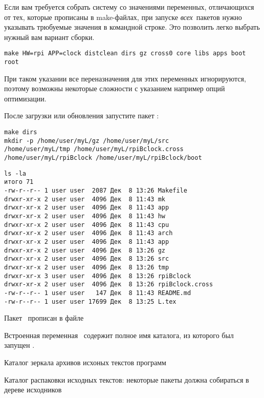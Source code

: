 
Если вам требуется собрать систему со значениями переменных, отличающихся от
тех, которые прописаны в make-файлах, при запуске \emph{всех}\ пакетов нужно
указывать трюбуемые значения в командной строке. Это позволить легко выбрать
нужный вам вариант сборки.

\begin{verbatim}
make HW=rpi APP=clock distclean dirs gz cross0 core libs apps boot root
\end{verbatim}

При таком указании все переназначения для этих переменных игнорируются, поэтому
возможны некоторые сложности с указанием например опций оптимизации.

 \label{azdirs}

После загрузки или обновления запустите пакет :

\begin{verbatim}
make dirs
mkdir -p /home/user/myL/gz /home/user/myL/src
/home/user/myL/tmp /home/user/myL/rpiBclock.cross
/home/user/myL/rpiBclock /home/user/myL/rpiBclock/boot
\end{verbatim}
\begin{verbatim}
ls -la
итого 71
-rw-r--r-- 1 user user  2087 Дек  8 13:26 Makefile
drwxr-xr-x 2 user user  4096 Дек  8 11:43 mk
drwxr-xr-x 2 user user  4096 Дек  8 11:43 app
drwxr-xr-x 2 user user  4096 Дек  8 11:43 hw
drwxr-xr-x 2 user user  4096 Дек  8 11:43 cpu
drwxr-xr-x 2 user user  4096 Дек  8 11:43 arch
drwxr-xr-x 2 user user  4096 Дек  8 11:43 app
drwxr-xr-x 2 user user  4096 Дек  8 13:26 gz
drwxr-xr-x 2 user user  4096 Дек  8 13:26 src
drwxr-xr-x 2 user user  4096 Дек  8 13:26 tmp
drwxr-xr-x 3 user user  4096 Дек  8 13:26 rpiBclock
drwxr-xr-x 2 user user  4096 Дек  8 13:26 rpiBclock.cross
-rw-r--r-- 1 user user   147 Дек  8 11:43 README.md
-rw-r--r-- 1 user user 17699 Дек  8 13:25 L.tex
\end{verbatim}

Пакет \ прописан в файле


Встроенная переменная \ содержит полное имя каталога, из которого был
запущен .

\bigskip
Каталог зеркала архивов исхоных текстов программ


Каталог распаковки исходных текстов: некоторые пакеты должна собираться в дереве
исходников

